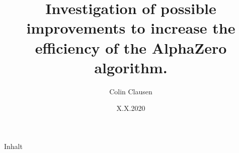 \documentclass[11pt]{beamer}
\title[Investigation of improvements to AlphaZero]{Investigation of possible improvements to increase the efficiency of the AlphaZero algorithm.}
\author{Colin Clausen}
\date{X.X.2020}
\begin{document}
	 \frame{\titlepage}

        \begin{frame}{Inhalt}
	\scriptsize{\tableofcontents[hideallsubsections]}
	\end{frame}
		
\end{document}
